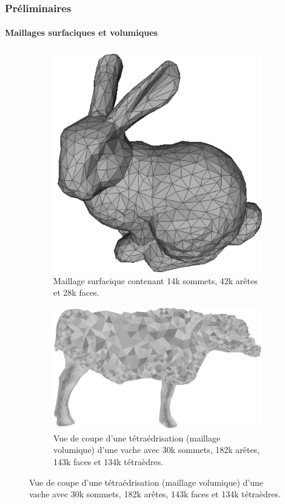 \documentclass[9pt]{beamer}
\begin{document}
\begin{frame}
\frametitle{Préliminaires}
\framesubtitle{Maillages surfaciques et volumiques}
\begin{figure}[H]
\centering
\begin{subfigure}{.5\textwidth}
  \centering
  \includegraphics[scale=0.17]{Images/bunny}
  \caption{Maillage surfacique contenant 14k sommets, 42k arêtes et 28k faces.}
\end{subfigure}%
\begin{subfigure}{.5\textwidth}
  \centering
  \includegraphics[scale=0.14]{Images/cow_cut}
  \caption{Vue de coupe d'une tétraédrisation (maillage volumique) d'une vache avec 30k sommets, 182k arêtes, 143k faces et 134k tétraèdres.}

\end{subfigure}
\end{figure}
\end{frame}
\end{document}
